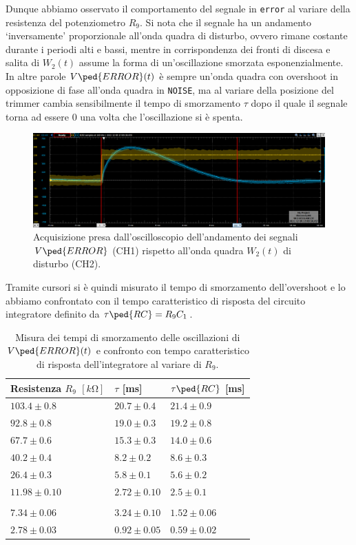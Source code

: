 \documentclass[10pt, a4paper, italian]{article}
\begin{document}
Dunque abbiamo osservato il comportamento del segnale in \verb+error+ al
variare della resistenza del potenziometro $R_9$. Si nota che il segnale
ha un andamento `inversamente' proporzionale all'onda quadra di disturbo,
ovvero rimane costante durante i periodi alti e bassi, mentre in
corrispondenza dei fronti di discesa e salita di $W_2 (t)$ assume la forma di
un'oscillazione smorzata esponenzialmente. In altre parole $V\ped{ERROR} (t)$
è sempre un'onda quadra con overshoot in opposizione di fase all'onda quadra in
\verb+NOISE+, ma al variare della posizione del trimmer cambia sensibilmente
il tempo di smorzamento $\tau$ dopo il quale il segnale torna ad essere 0 una
volta che l'oscillazione si è spenta.
\begin{figure}[htbp]
    \centering
	\includegraphics[width=\textwidth]{7}
    \caption{Acquisizione presa dall'oscilloscopio dell'andamento dei segnali
    $V\ped{ERROR}$ (CH1) rispetto all'onda quadra $W_2 (t)$ di disturbo (CH2).
    \label{fig: errnoise}}
\end{figure}

Tramite cursori si è quindi misurato il tempo di smorzamento dell'overshoot e
lo abbiamo confrontato con il tempo caratteristico di risposta del circuito
integratore definito da $\tau\ped{RC} = R_9 C_1$.
\begin{table}[htbp]
\centering
\begin{tabular}{@{}lll@{}}
\toprule
Resistenza $R_9$ $[\si{k\ohm}]$ & $\tau$ [ms] & $\tau\ped{RC}$ [ms] \\
\midrule
\midrule
$103.4 \pm 0.8 $ & $20.7 \pm 0.4$ & $ 21.4 \pm 0.9$ \\
$92.8 \pm 0.8$	& $19.0 \pm 0.3$ & $ 19.2 \pm 0.8 $ \\
$67.7 \pm 0.6$	& $15.3 \pm 0.3$ & $ 14.0 \pm 0.6 $ \\
$40.2 \pm 0.4$	& $8.2 \pm 0.2$ & $ 8.6 \pm 0.3 $ \\
$26.4 \pm 0.3$	& $5.8 \pm 0.1$ & $ 5.6 \pm 0.2 $ \\
$11.98 \pm 0.10$ & $2.72 \pm 0.10$ & $2.5 \pm 0.1$ \\
\\
$7.34 \pm 0.06$ & $3.24 \pm 0.10$ & $ 1.52 \pm 0.06$ \\
$2.78 \pm 0.03$ & $0.92 \pm 0.05$ & $ 0.59 \pm 0.02$ \\
\bottomrule
\end{tabular}
\caption{Misura dei tempi di smorzamento delle oscillazioni
di $V\ped{ERROR} (t)$ e confronto con tempo caratteristico di risposta
dell'integratore al variare di $R_9$.}
\end{table}
\end{document}
